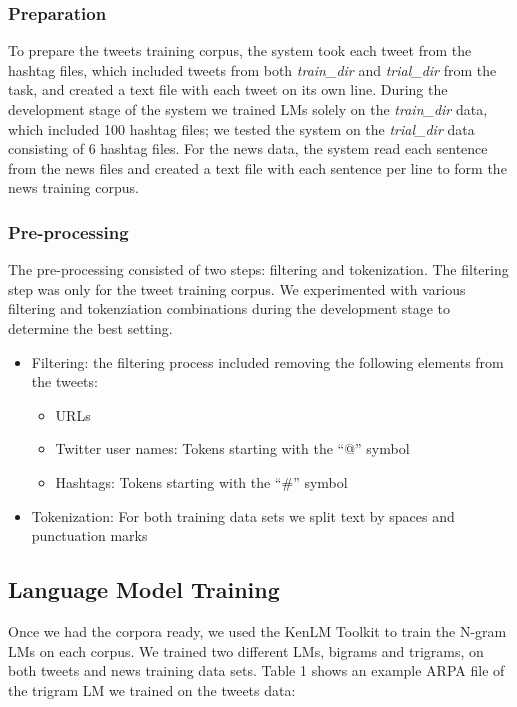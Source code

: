\documentclass[11pt,a4paper]{article}
\begin{document}
\subsubsection{Preparation}
To prepare the tweets training corpus, the system took each tweet from the hashtag files, which included tweets from both \textit{train\_dir} and \textit{trial\_dir} from the task, and created a text file with each tweet on its own line. During the development stage of the system we trained LMs solely on the \textit{train\_dir} data, which included 100 hashtag files; we tested the system on the \textit{trial\_dir} data consisting of 6 hashtag files. For the news data, the system read each sentence from the news files and created a text file with each sentence per line to form the news training corpus. 
\subsubsection{Pre-processing}
The pre-processing consisted of two steps: filtering and tokenization. The filtering step was only for the tweet training corpus. We experimented with various filtering and tokenziation combinations during the development stage to determine the best setting. 
\begin{itemize}
\item Filtering: the filtering process included removing the following elements from the tweets:
\begin{itemize}
\item URLs
\item Twitter user names: Tokens starting with the ``@'' symbol 
\item Hashtags: Tokens starting with the ``\#'' symbol 
\end{itemize}
\item Tokenization: For both training data sets we split text by spaces and punctuation marks
\end{itemize}

\subsection{Language Model Training}
Once we had the corpora ready, we used the KenLM Toolkit to train the N-gram LMs on each corpus. We trained two different LMs, bigrams and trigrams, on both tweets and news training data sets. Table 1 shows an example ARPA file of the trigram LM we trained on the tweets data:
\end{document}
